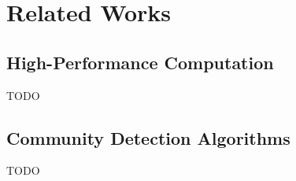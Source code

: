 \section{Related Works}

\subsection{High-Performance Computation}

\par TODO\citep{compiler-for-hpc}

\subsection{Community Detection Algorithms}

\par TODO
